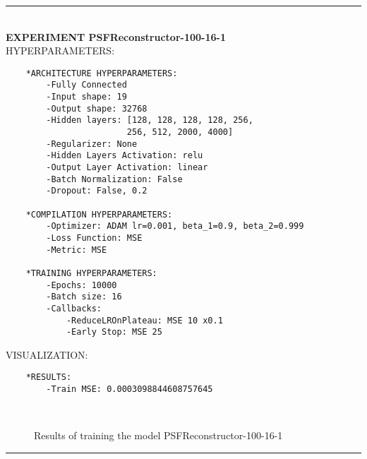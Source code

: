 \rule{0.5\textwidth}{0.5pt}\\

	{\large \textbf{EXPERIMENT PSFReconstructor-100-16-1}}\\
	
	{\normalsize HYPERPARAMETERS:}
	\begin{lstlisting}
	*ARCHITECTURE HYPERPARAMETERS:
		-Fully Connected
		-Input shape: 19
		-Output shape: 32768
		-Hidden layers: [128, 128, 128, 128, 256,
						256, 512, 2000, 4000]
		-Regularizer: None
		-Hidden Layers Activation: relu
		-Output Layer Activation: linear
		-Batch Normalization: False
		-Dropout: False, 0.2
	
	*COMPILATION HYPERPARAMETERS:
		-Optimizer: ADAM lr=0.001, beta_1=0.9, beta_2=0.999
		-Loss Function: MSE
		-Metric: MSE
	
	*TRAINING HYPERPARAMETERS:
		-Epochs: 10000
		-Batch size: 16
		-Callbacks: 
			-ReduceLROnPlateau: MSE 10 x0.1
			-Early Stop: MSE 25
	\end{lstlisting}
	
	{\normalsize VISUALIZATION:}
	\begin{lstlisting}
	*RESULTS:
        -Train MSE: 0.0003098844608757645
	\end{lstlisting}
	
	\begin{figure*}[ht!]
		\hspace{\fill}
		\hspace{\fill}	
		\\
		\caption{Results of training the model PSFReconstructor-100-16-1}
	\end{figure*}
	
\FloatBarrier	
\rule{0.5\textwidth}{0.5pt}\\